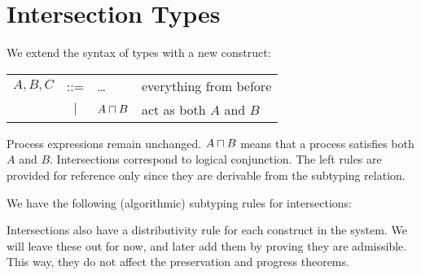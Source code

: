 
\section{Intersection Types}

We extend the syntax of types with a new construct:
\begin{center}
\begin{tabular}{l c l l}
  $A, B, C$ & ::= & \ldots            & everything from before \\
            & $|$ & $A \mathbin{\sqcap} B$  & act as both $A$ and $B$ \\
\end{tabular}
\end{center}

Process expressions remain unchanged. $A \mathbin{\sqcap} B$ means that a process satisfies both $A$ and $B.$ Intersections correspond to logical conjunction. The left rules are provided for reference only since they are derivable from the subtyping relation.


We have the following (algorithmic) subtyping rules for intersections:


Intersections also have a distributivity rule for each construct in the system. We will leave these out for now, and later add them by proving they are admissible. This way, they do not affect the preservation and progress theorems.
